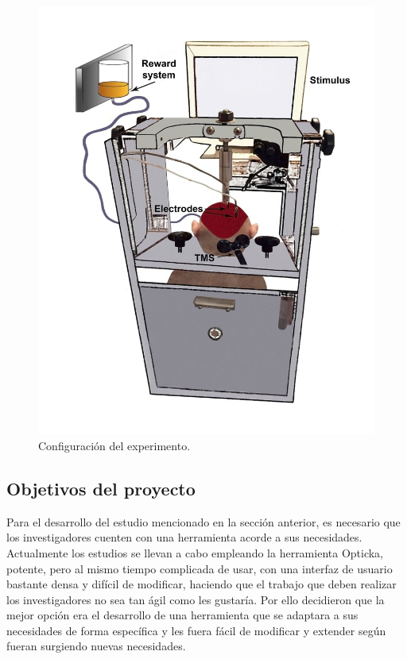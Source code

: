 \documentclass[conference]{IEEEtran}
\begin{document}
\begin{figure}[tp]
\centerline{\includegraphics[width=\linewidth]{figures/mono}}
\caption{Configuración del experimento.}
\label{figMono}
\end{figure}
\subsection{Objetivos del proyecto}

Para el desarrollo del estudio mencionado en la sección anterior, es necesario que los investigadores cuenten con una herramienta acorde a sus necesidades. Actualmente los estudios se llevan a cabo empleando la herramienta Opticka, potente, pero al mismo tiempo complicada de usar, con una interfaz de usuario bastante densa y difícil de modificar, haciendo que el trabajo que deben realizar los investigadores no sea tan ágil como les gustaría. Por ello decidieron que la mejor opción era el desarrollo de una herramienta que se adaptara a sus necesidades de forma específica y les fuera fácil de modificar y extender según fueran surgiendo nuevas necesidades.
\end{document}

